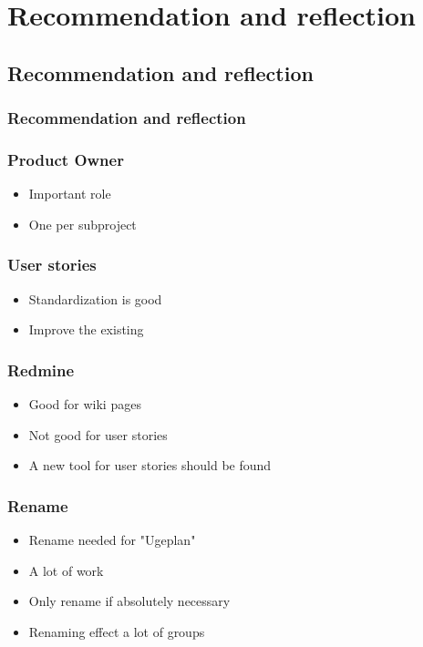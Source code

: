 \section{Recommendation and reflection}
\subsection{Recommendation and reflection}
\begin{frame}
	\frametitle{Recommendation and reflection}
\end{frame}

\begin{frame}
	\frametitle{Product Owner}
	\begin{itemize}
		\item Important role
		\item One per subproject
	\end{itemize}
\end{frame}

\begin{frame}
	\frametitle{User stories}
	\begin{itemize}
		\item Standardization is good
		\item Improve the existing
	\end{itemize}
\end{frame}

\begin{frame}
	\frametitle{Redmine}
	\begin{itemize}
		\item Good for wiki pages
		\item Not good for user stories
		\item A new tool for user stories should be found
	\end{itemize}
\end{frame}

\begin{frame}
	\frametitle{Rename}
	\begin{itemize}
		\item Rename needed for "Ugeplan"
		\item A lot of work
		\item Only rename if absolutely necessary
		\item Renaming effect a lot of groups
	\end{itemize}
\end{frame}

